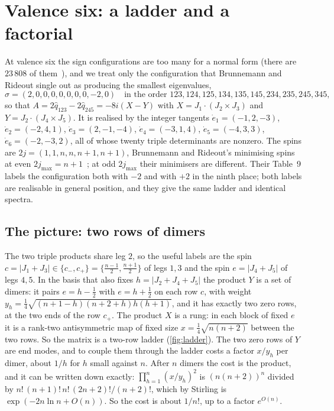 \section{Valence six: a ladder and a factorial}\label{sec:v6}

At valence six the sign configurations are too many for a normal form (there are
$23\,808$ of them~\cite[Table~1]{BR2008b}), and we treat only the configuration that
Brunnemann and Rideout single out as producing the smallest eigenvalues,
\[
  \sigma=(2,0,0,0,0,0,0,0,-2,0)\quad\text{in the order }123,124,125,134,135,145,234,235,245,345,
\]
so that $A=2\hat q_{123}-2\hat q_{245}=-8i(X-Y)$ with $X=J_1\cdot(J_2\times J_3)$ and
$Y=J_2\cdot(J_4\times J_5)$. It is realised by the integer tangents
$\dot e_1=(-1,2,-3)$, $\dot e_2=(-2,4,1)$, $\dot e_3=(2,-1,-4)$, $\dot e_4=(-3,1,4)$,
$\dot e_5=(-4,3,3)$, $\dot e_6=(-2,-3,2)$, all of whose twenty triple determinants are
nonzero. The spins are $2j=(1,1,n,n,n+1,n+1)$, Brunnemann and Rideout's minimising
spins at even $2j_{\max}=n+1$~\cite[Table~9]{BR2008b}; at odd $2j_{\max}$ their minimisers
are different. Their Table~9 labels the configuration both with $-2$ and with $+2$ in the
ninth place; both labels are realisable in general position, and they give the same ladder and
identical spectra.

\subsection{The picture: two rows of dimers}

The two triple products share leg $2$, so the useful labels are the spin
$c=|J_1+J_3|\in\{c_-,c_+\}=\{\frac{n-1}2,\frac{n+1}2\}$ of legs $1,3$ and the spin
$e=|J_4+J_5|$ of legs $4,5$. In the basis that also fixes $h=|J_2+J_4+J_5|$ the
product $Y$ is a set of dimers: it pairs $e=h-\frac12$ with $e=h+\frac12$ on each row
$c$, with weight $y_h=\frac14\sqrt{(n+1-h)(n+2+h)h(h+1)}$, and it has exactly two zero
rows, at the two ends of the row $c_+$. The product $X$ is a rung: in each block of fixed
$e$ it is a rank-two antisymmetric map of fixed size $x=\frac14\sqrt{n(n+2)}$ between
the two rows. So the matrix is a two-row ladder (\cref{fig:ladder}). The two zero rows
of $Y$ are end modes, and to couple them through the ladder costs a factor $x/y_h$ per
dimer, about $1/h$ for $h$ small against $n$. After $n$ dimers the cost is the product,
and it can be written down exactly: $\prod_{h=1}^n(x/y_h)^2$ is $(n(n+2))^n$ divided by
$n!\,(n+1)!\,n!\,(2n+2)!/(n+2)!$, which by Stirling is $\exp(-2n\ln n+O(n))$. So the cost
is about $1/n!$, up to a factor $e^{O(n)}$.

